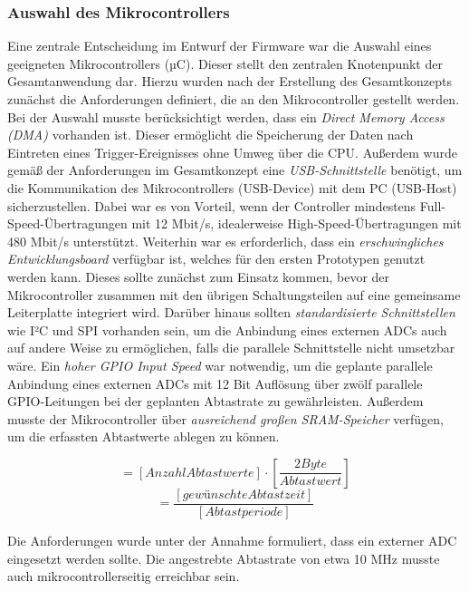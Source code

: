 \documentclass[a4paper, portrait, 12pt]{scrartcl} %
\begin{document}
\subsubsection{Auswahl des Mikrocontrollers}
Eine zentrale Entscheidung im Entwurf der Firmware war die Auswahl eines geeigneten Mikrocontrollers (µC). Dieser stellt den zentralen Knotenpunkt der Gesamtanwendung dar. Hierzu wurden nach der Erstellung des Gesamtkonzepts zunächst die Anforderungen definiert, die an den Mikrocontroller gestellt werden.
Bei der Auswahl musste berücksichtigt werden, dass ein \emph{Direct Memory Access (DMA)} vorhanden ist. Dieser ermöglicht die Speicherung der Daten nach Eintreten eines Trigger-Ereignisses ohne Umweg über die CPU. Außerdem wurde gemäß der Anforderungen im Gesamtkonzept eine \emph{USB-Schnittstelle} benötigt, um die Kommunikation des Mikrocontrollers (USB-Device) mit dem PC (USB-Host) sicherzustellen. Dabei war es von Vorteil, wenn der Controller mindestens Full-Speed-Übertragungen mit 12 Mbit/s, idealerweise High-Speed-Übertragungen mit 480 Mbit/s unterstützt. Weiterhin war es erforderlich, dass ein \emph{erschwingliches Entwicklungsboard} verfügbar ist, welches für den ersten Prototypen genutzt werden kann. Dieses sollte zunächst zum Einsatz kommen, bevor der Mikrocontroller zusammen mit den übrigen Schaltungsteilen auf eine gemeinsame Leiterplatte integriert wird. Darüber hinaus sollten \emph{standardisierte Schnittstellen} wie I²C und SPI vorhanden sein, um die Anbindung eines externen ADCs auch auf andere Weise zu ermöglichen, falls die parallele Schnittstelle nicht umsetzbar wäre. Ein \emph{hoher GPIO Input Speed} war notwendig, um die geplante parallele Anbindung eines externen ADCs mit 12 Bit Auflösung über zwölf parallele GPIO-Leitungen bei der geplanten Abtastrate zu gewährleisten. Außerdem musste der Mikrocontroller über \emph{ausreichend großen SRAM-Speicher} verfügen, um die erfassten Abtastwerte ablegen zu können.

\begin{footnotesize}
	\begin{equation}
	[Benötigter Speicher] = [Anzahl Abtastwerte]\cdot \left[\frac{2 Byte}{Abtastwert}\right]
\end{equation}
\begin{equation}
	[Anzahl Abtastwerte] = \frac{[gewünschte Abtastzeit]}{[Abtastperiode]}
\end{equation}
\end{footnotesize}

Die Anforderungen wurde unter der Annahme formuliert, dass ein externer ADC eingesetzt werden sollte. Die angestrebte Abtastrate von etwa 10 MHz musste auch mikrocontrollerseitig erreichbar sein.\\
\end{document}
